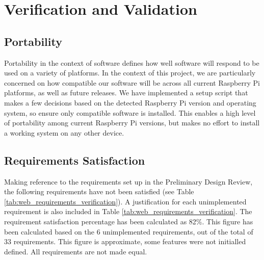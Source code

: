 \section{Verification and Validation}



\subsection{Portability}
Portability in the context of software defines how well software will respond to be used on a variety of platforms. In the context of this project, we are particularly concerned on how compatible our software will be across all current Raspberry Pi platforms, as well as future releases.
\newline
We have implemented a setup script that makes a few decisions based on the detected Raspberry Pi version and operating system, so ensure only compatible software is installed. This enables a high level of portability among current Raspberry Pi versions, but makes no effort to install a working system on any other device.


\subsection{Requirements Satisfaction}
Making reference to the requirements set up in the Preliminary Design Review\cite{tibby-lit-review}, the following requirements have not been satisfied (see Table \ref{tab:web_requirements_verification}). A justification for each unimplemented requirement is also included in Table \ref{tab:web_requirements_verification}.
\newline
The requirement satisfaction percentage has been calculated as 82\%. This figure has been calculated based on the 6 unimplemented requirements, out of the total of 33 requirements. This figure is approximate, some features were not initialled defined. All requirements are not made equal.

